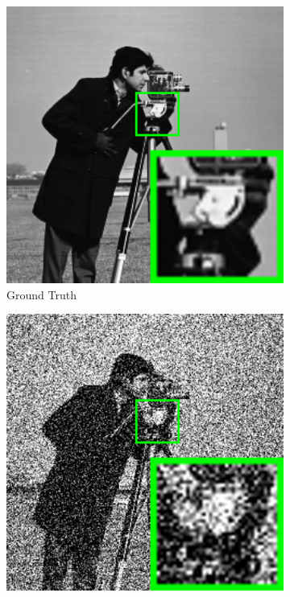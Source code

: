 \begin{figure}
    \centering
    \begin{subfigure}[t]{0.24\textwidth}
        \centering
        \includegraphics[width=1\textwidth]{images/pgpd/br_cameraman.png}
	   \caption{Ground Truth}
    \end{subfigure}
    \hfill
    \begin{subfigure}[t]{0.24\textwidth}
        \centering
        \includegraphics[width=1\textwidth]{images/pgpd/br_cameraman_75.png}

\end{subfigure}
\end{figure}
